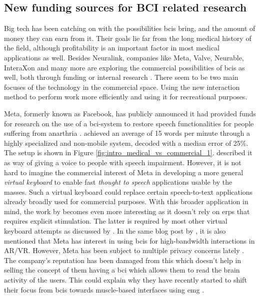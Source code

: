 \subsection{New funding sources for BCI related research}
\label{subsec:bci_gaining_popularity_big_tech}
Big tech has been catching on with the possibilities \glspl{bci} bring, and the amount of money they can earn from it.
Their goals lie far from the long medical history of the field, although profitability is an important factor in most medical applications as well.
Besides Neuralink, companies like Meta, Valve, Neurable, InteraXon and many more are exploring the commercial possibilities of \glspl{bci} as well, both through funding or internal research \citep{facebook_bci_keyboard, valve_bci_interest, neurable_white_paper, interaxon_tests}.
There seem to be two main focuses of the technology in the commercial space.
Using the new interaction method to perform work more efficiently and using it for recreational purposes.

Meta, formerly known as Facebook, has publicly announced it had provided funds for research on the use of a \gls{bci}-system to restore speech functionalities for people suffering from anarthria \citep{facebook_bci_keyboard, facebook_bci_blog}.
 achieved an average of 15 words per minute through a highly specialized and non-mobile system, decoded with a median error of 25\%.
The setup is shown in Figure \ref{fig:intro_medical_vs_commercial_1}.
 described it as way of giving a voice to people with speech impairment.
However, it is not hard to imagine the commercial interest of Meta in developing a more general \textit{virtual keyboard} to enable fast \textit{thought to speech} applications usable by the masses.
Such a virtual keyboard could replace certain speech-to-text applications already broadly used for commercial purposes.
With this broader application in mind, the work by \citet{facebook_bci_keyboard} becomes even more interesting as it doesn't rely on \glspl{erp} that requires explicit stimulation.
The latter is required by most other virtual keyboard attempts as discussed by \citet{bci_keyboard}.
In the same blog post by \citet{facebook_bci_blog}, it is also mentioned that Meta has interest in using \glspl{bci} for high-bandwidth interactions in AR/VR.
However, Meta has been subject to multiple privacy concerns lately \citep{facebook_drama1, facebook_drama2}.
The company's reputation has been damaged from this which doesn't help in selling the concept of them having a \gls{bci} which allows them to read the brain activity of the users.
This could explain why they have recently started to shift their focus from \glspl{bci} towards muscle-based interfaces using \gls{emg} \citep{facebook_bci_blog}.

